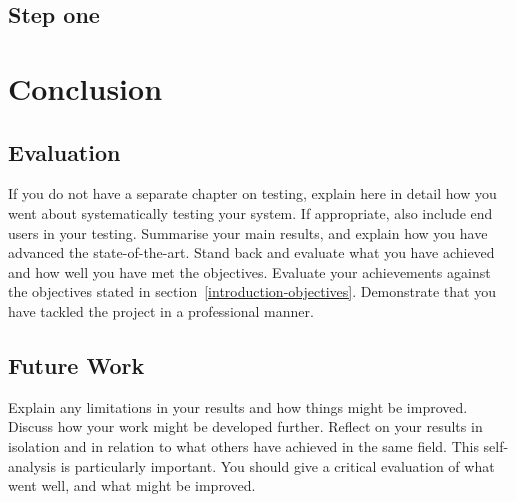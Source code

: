 \documentclass[a4paper,11pt]{report}
\begin{document}
\section{Step one}
\label{stepOne}
	 


\chapter{Conclusion}

\label{conclusion}

\section{Evaluation}

\label{conclusion-evaluation}

If you do not have a separate chapter on testing, explain here in detail how you
went about systematically testing your system. If appropriate, also include
end users in your testing. Summarise your main results, and explain how you have
advanced the state-of-the-art. Stand back and evaluate what you have achieved
and how well you have met the objectives. Evaluate your achievements against the
objectives stated in section~\ref{introduction-objectives}. Demonstrate that you
have tackled the project in a professional manner.

\section{Future Work}

\label{conclusion-future}

Explain any limitations in your results and how things might be improved.
Discuss how your work might be developed further. Reflect on your results in
isolation and in relation to what others have achieved in the same field. This
self-analysis is particularly important. You should give a critical evaluation
of what went well, and what might be improved.







\appendix
\end{document}
